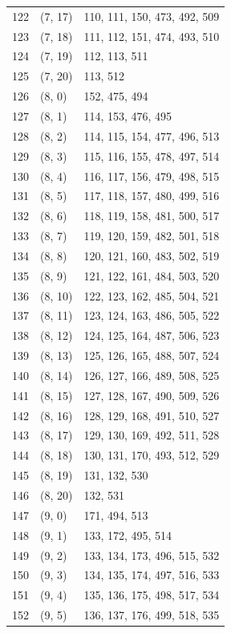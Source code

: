 \documentclass{article}
\begin{document}
\begin{longtable}{lll}
  122 & (7, 17) & 110, 111, 150, 473, 492, 509 \\
  123 & (7, 18) & 111, 112, 151, 474, 493, 510 \\
  124 & (7, 19) & 112, 113, 511 \\
  125 & (7, 20) & 113, 512 \\
  126 & (8, 0) & 152, 475, 494 \\
  127 & (8, 1) & 114, 153, 476, 495 \\
  128 & (8, 2) & 114, 115, 154, 477, 496, 513 \\
  129 & (8, 3) & 115, 116, 155, 478, 497, 514 \\
  130 & (8, 4) & 116, 117, 156, 479, 498, 515 \\
  131 & (8, 5) & 117, 118, 157, 480, 499, 516 \\
  132 & (8, 6) & 118, 119, 158, 481, 500, 517 \\
  133 & (8, 7) & 119, 120, 159, 482, 501, 518 \\
  134 & (8, 8) & 120, 121, 160, 483, 502, 519 \\
  135 & (8, 9) & 121, 122, 161, 484, 503, 520 \\
  136 & (8, 10) & 122, 123, 162, 485, 504, 521 \\
  137 & (8, 11) & 123, 124, 163, 486, 505, 522 \\
  138 & (8, 12) & 124, 125, 164, 487, 506, 523 \\
  139 & (8, 13) & 125, 126, 165, 488, 507, 524 \\
  140 & (8, 14) & 126, 127, 166, 489, 508, 525 \\
  141 & (8, 15) & 127, 128, 167, 490, 509, 526 \\
  142 & (8, 16) & 128, 129, 168, 491, 510, 527 \\
  143 & (8, 17) & 129, 130, 169, 492, 511, 528 \\
  144 & (8, 18) & 130, 131, 170, 493, 512, 529 \\
  145 & (8, 19) & 131, 132, 530 \\
  146 & (8, 20) & 132, 531 \\
  147 & (9, 0) & 171, 494, 513 \\
  148 & (9, 1) & 133, 172, 495, 514 \\
  149 & (9, 2) & 133, 134, 173, 496, 515, 532 \\
  150 & (9, 3) & 134, 135, 174, 497, 516, 533 \\
  151 & (9, 4) & 135, 136, 175, 498, 517, 534 \\
  152 & (9, 5) & 136, 137, 176, 499, 518, 535 \\

\end{longtable}
\end{document}
